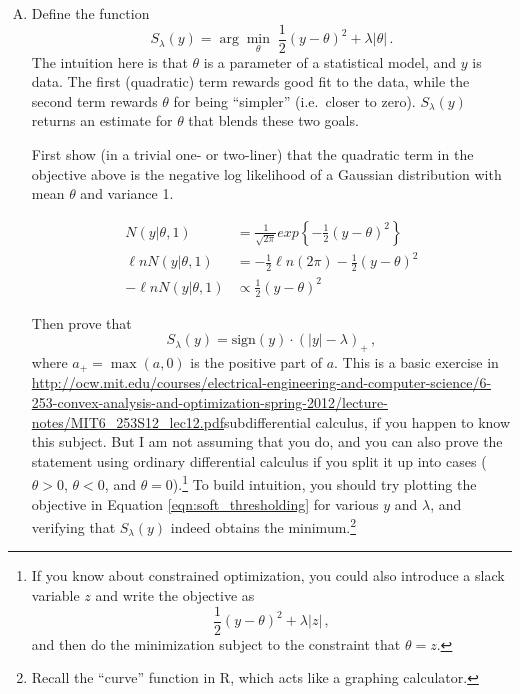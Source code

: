 \documentclass{article}
\begin{document}
\begin{enumerate}[(A)]
\item Define the function
\begin{equation}
\label{eqn:soft_thresholding}
S_\lambda(y) = \arg \min_{\theta} \; \frac{1}{2}(y - \theta)^2 + \lambda | \theta | \, .
\end{equation}
The intuition here is that $\theta$ is a parameter of a statistical model, and $y$ is data.   The first (quadratic) term rewards good fit to the data, while the second term rewards $\theta$ for being ``simpler'' (i.e.~closer to zero).  $S_\lambda(y)$ returns an estimate for $\theta$ that blends these two goals.

First show (in a trivial one- or two-liner) that the quadratic term in the objective above is the negative log likelihood of a Gaussian distribution with mean $\theta$ and variance 1.  

\color{blue}
\begin{align*}
N(y|\theta, 1) &= \frac{1}{\sqrt{2 \pi }}exp\left\{-\frac{1}{2} (y-\theta)^2 \right\}\\
\ell n N(y|\theta, 1) &= -\frac{1}{2}\ell n(2 \pi) -\frac{1}{2} (y-\theta)^2 \\
-\ell n N(y|\theta, 1) & \propto \frac{1}{2} (y-\theta)^2
\end{align*}
\color{black}

Then prove that 
$$
S_\lambda(y) = \mbox{sign}(y) \cdot (|y| - \lambda)_+ \, ,
$$
where $a_+ = \max(a,0)$ is the positive part of $a$.  This is a basic exercise in \url{http://ocw.mit.edu/courses/electrical-engineering-and-computer-science/6-253-convex-analysis-and-optimization-spring-2012/lecture-notes/MIT6_253S12_lec12.pdf}{subdifferential calculus}, if you happen to know this subject.  But I am not assuming that you do, and you can also prove the statement using ordinary differential calculus if you split it up into cases ($\theta>0$, $\theta<0$, and $\theta=0$).\footnote{If you know about constrained optimization, you could also introduce a slack variable $z$ and write the objective as
$$
\frac{1}{2}(y - \theta)^2 + \lambda | z | \, ,
$$
and then do the minimization subject to the constraint that $\theta = z$.}  To build intuition, you should try plotting the objective in Equation \ref{eqn:soft_thresholding} for various $y$ and $\lambda$, and verifying that $S_\lambda(y)$ indeed obtains the minimum.\footnote{Recall the ``curve'' function in R, which acts like a graphing calculator.}


\end{enumerate}
\end{document}

